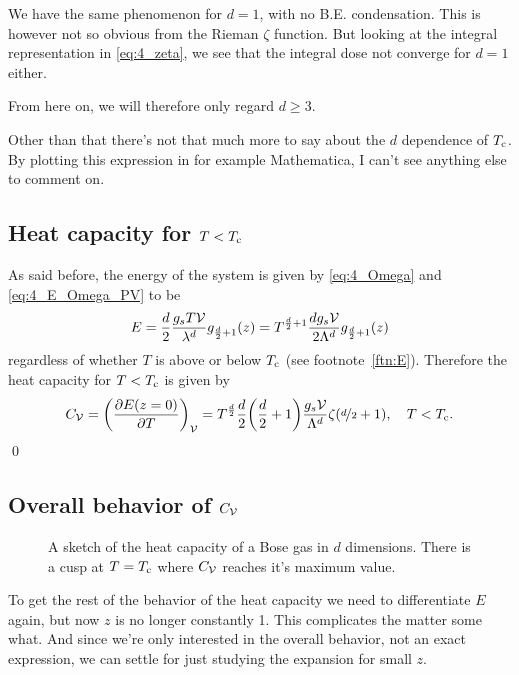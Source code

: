 \documentclass[11pt,letter, swedish, english
]{article}
\begin{document}
We have the same phenomenon for $d=1$, with no B.E. condensation. This
is however not so obvious from the Rieman $\zeta$ function. But
looking at the integral representation in \eqref{eq:4_zeta}, we see
that the integral dose not converge for $d=1$ either. 

From here on, we will therefore only regard $d\ge3$.

Other than that there's not that much more to say about the $d$
dependence of $T_{\text{c}}$. By plotting this expression in for example
Mathematica, I can't see anything else to comment on. 


\subsection{Heat capacity for $T<T_{\text{c}}$}
\newcommand{\Kd}{\ensuremath{\mathcal{K}_d}}
As said before, the energy of the system is given by
\eqref{eq:4_Omega} and \eqref{eq:4_E_Omega_PV} to be
\begin{equation}\label{eq:4d_E}
E=\frac{d}{2}\frac{g_sT\mathcal{V}}{\lambda^d}g_{\frac{d}{2}+1}(z)
=T^{\frac{d}{2}+1}\frac{d g_s\mathcal{V}}{2\Lambda^d}g_{\frac{d}{2}+1}(z)
\end{equation}
regardless of whether $T$ is above or below $T_{\text{c}}$ (see
footnote~\ref{ftn:E}). Therefore the heat capacity for $T<T_{\text{c}}$ is given by
\begin{equation}\label{eq:4b_Cv}
C_\V=\qty(\pdv{E(z=0)}{T})_\V
=T^{\D{2}}\frac{d}{2}\qty(\D{2}+1)\frac{g_s\V}{\Lambda^d}\zeta(\nD{2}+1)
\qcomma T<\Tc.
\end{equation}
\qed


\subsection{Overall behavior of $C_{\mathcal{V}}$}
\begin{figure}\centering
\resizebox{.5\textwidth}{!}{}
\caption{A sketch of the heat capacity of a Bose gas in $d$
  dimensions. There is a cusp at $T=T_{\text{c}}$ where $C_{\mathcal{V}}$ reaches it's
  maximum value. }
\label{fig:Cv}
\end{figure}

To get the rest of the behavior of the heat capacity we need to
differentiate $E$ again, but now $z$ is no longer constantly 1. This
complicates the matter some what. And since we're only interested in
the overall behavior, not an exact expression, we can settle for just
studying the expansion for small  $z$.
\end{document}
